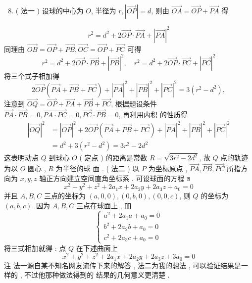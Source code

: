 \documentclass[10pt]{article}
\begin{document}
\begin{enumerate}
  \setcounter{enumi}{7}
  \item ( 法一 )  设球的中心为  $O$,  半径为  $r,|\overrightarrow{O P}|=d$,  则由  $\overrightarrow{O A}=\overrightarrow{O P}+\overrightarrow{P A}$  得 
\end{enumerate}
$$
r^{2}=d^{2}+2 \overrightarrow{O P} \cdot \overrightarrow{P A}+|\overrightarrow{P A}|^{2}
$$
 同理由  $\overrightarrow{O B}=\overrightarrow{O P}+\overrightarrow{P B}, \overrightarrow{O C}=\overrightarrow{O P}+\overrightarrow{P C}$  可得 
$$
r^{2}=d^{2}+2 \overrightarrow{O P} \cdot \overrightarrow{P B}+|\overrightarrow{P B}|^{2}, \quad r^{2}=d^{2}+2 \overrightarrow{O P} \cdot \overrightarrow{P C}+|\overrightarrow{P C}|^{2}
$$
 将三个式子相加得 
$$
2 \overrightarrow{O P}(\overrightarrow{P A}+\overrightarrow{P B}+\overrightarrow{P C})+|\overrightarrow{P A}|^{2}+|\overrightarrow{P B}|^{2}+|\overrightarrow{P C}|^{2}=3\left(r^{2}-d^{2}\right),
$$
 注意到  $\overrightarrow{O Q}=\overrightarrow{O P}+\overrightarrow{P A}+\overrightarrow{P B}+\overrightarrow{P C}$,  根据题设条件  $\overrightarrow{P A} \cdot \overrightarrow{P B}=0, \overrightarrow{P A \cdot P C}=0, \overrightarrow{P C} \cdot \overrightarrow{P B}=0$,  再利用内积   的性质得 
$$
\begin{aligned}
|\overrightarrow{O Q}|^{2} &=|\overrightarrow{O P}|^{2}+2 \overrightarrow{O P}(\overrightarrow{P A}+\overrightarrow{P B}+\overrightarrow{P C})+|\overrightarrow{P A}|^{2}+|\overrightarrow{P B}|^{2}+|\overrightarrow{P C}|^{2} \\
&=d^{2}+3\left(r^{2}-d^{2}\right)=3 r^{2}-2 d^{2}
\end{aligned}
$$
 这表明动点  $Q$  到球心  $O$ ( 定点 )  的距离是常数  $R=\sqrt{3 r^{2}-2 d^{2}}$,  故  $Q$  点的轨迹为以  $O$  圆心 , $R$  为半径的球   面 . ( 法二 )  以  $P$  为坐标原点 , $\overrightarrow{P A}, \overrightarrow{P B}, \overrightarrow{P C}$  所指方向为  $x, y, z$  轴正方向建立空间直角坐标系 .  可设球面的方程  ข
$$
x^{2}+y^{2}+z^{2}+2 a_{1} x+2 a_{2} y+2 a_{3} z+a_{0}=0
$$
 并且  $A, B, C$  三点的坐标为  $(a, 0,0),(0, b, 0),(0,0, c)$,  则  $Q$  的坐标为  $(a, b, c)$.  因为  $A, B, C$  三点在球面上 ,  吅 
$$
\left\{\begin{array}{l}
a^{2}+2 a_{1} a+a_{0}=0 \\
b^{2}+2 a_{2} b+a_{0}=0 \\
c^{2}+2 a_{3} c+a_{0}=0
\end{array}\right.
$$
 将三式相加就得 :  点  $Q$  在下述曲面上 
$$
x^{2}+y^{2}+z^{2}+2 a_{1} x+2 a_{2} y+2 a_{3} z+3 a_{0}=0
$$
 注   法一源自某不知名网友流传下来的解答 ,  法二为我的想法 ,  可以验证结果是一样的 ,  不过他那种做法得到的   结果的几何意义更清楚 .
\end{document}
